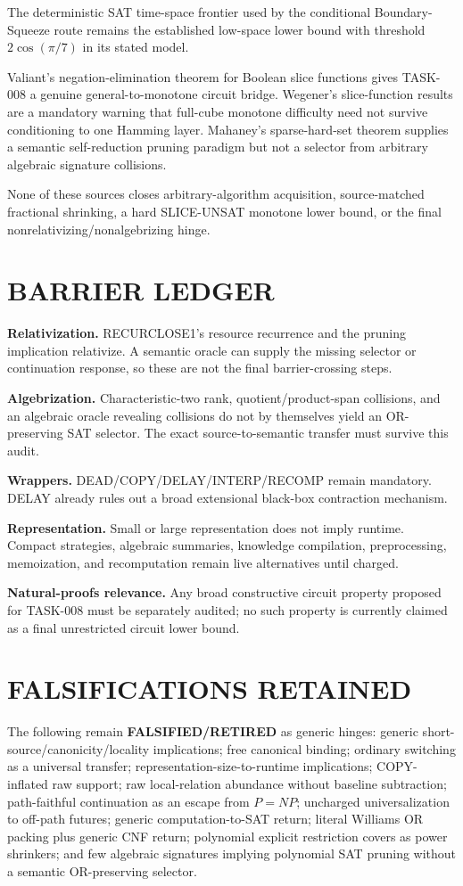 \documentclass[11pt]{article}
\begin{document}
The deterministic SAT time-space frontier used by the conditional Boundary-Squeeze route remains the established low-space lower bound with threshold \(2\cos(\pi/7)\) in its stated model.

Valiant's negation-elimination theorem for Boolean slice functions gives TASK-008 a genuine general-to-monotone circuit bridge. Wegener's slice-function results are a mandatory warning that full-cube monotone difficulty need not survive conditioning to one Hamming layer. Mahaney's sparse-hard-set theorem supplies a semantic self-reduction pruning paradigm but not a selector from arbitrary algebraic signature collisions.

None of these sources closes arbitrary-algorithm acquisition, source-matched fractional shrinking, a hard SLICE-UNSAT monotone lower bound, or the final nonrelativizing/nonalgebrizing hinge.

\section*{BARRIER LEDGER}
\textbf{Relativization.} RECURCLOSE1's resource recurrence and the pruning implication relativize. A semantic oracle can supply the missing selector or continuation response, so these are not the final barrier-crossing steps.

\textbf{Algebrization.} Characteristic-two rank, quotient/product-span collisions, and an algebraic oracle revealing collisions do not by themselves yield an OR-preserving SAT selector. The exact source-to-semantic transfer must survive this audit.

\textbf{Wrappers.} DEAD/COPY/DELAY/INTERP/RECOMP remain mandatory. DELAY already rules out a broad extensional black-box contraction mechanism.

\textbf{Representation.} Small or large representation does not imply runtime. Compact strategies, algebraic summaries, knowledge compilation, preprocessing, memoization, and recomputation remain live alternatives until charged.

\textbf{Natural-proofs relevance.} Any broad constructive circuit property proposed for TASK-008 must be separately audited; no such property is currently claimed as a final unrestricted circuit lower bound.

\section*{FALSIFICATIONS RETAINED}
The following remain \textbf{FALSIFIED/RETIRED} as generic hinges: generic short-source/canonicity/locality implications; free canonical binding; ordinary switching as a universal transfer; representation-size-to-runtime implications; COPY-inflated raw support; raw local-relation abundance without baseline subtraction; path-faithful continuation as an escape from \(P=NP\); uncharged universalization to off-path futures; generic computation-to-SAT return; literal Williams OR packing plus generic CNF return; polynomial explicit restriction covers as power shrinkers; and few algebraic signatures implying polynomial SAT pruning without a semantic OR-preserving selector.
\end{document}
